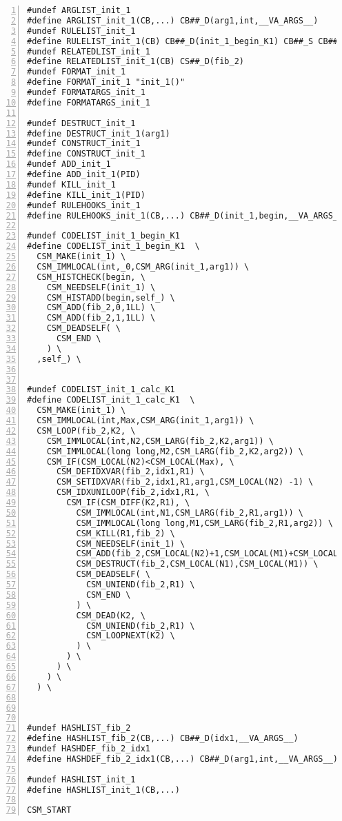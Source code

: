 {\begin{Verbatim}[frame=single,numbers=left]
#undef ARGLIST_init_1
#define ARGLIST_init_1(CB,...) CB##_D(arg1,int,__VA_ARGS__)
#undef RULELIST_init_1
#define RULELIST_init_1(CB) CB##_D(init_1_begin_K1) CB##_S CB##_D(init_1_calc_K1)
#undef RELATEDLIST_init_1
#define RELATEDLIST_init_1(CB) CS##_D(fib_2)
#undef FORMAT_init_1
#define FORMAT_init_1 "init_1()"
#undef FORMATARGS_init_1
#define FORMATARGS_init_1 

#undef DESTRUCT_init_1
#define DESTRUCT_init_1(arg1) 
#undef CONSTRUCT_init_1
#define CONSTRUCT_init_1 
#undef ADD_init_1
#define ADD_init_1(PID) 
#undef KILL_init_1
#define KILL_init_1(PID) 
#undef RULEHOOKS_init_1
#define RULEHOOKS_init_1(CB,...) CB##_D(init_1,begin,__VA_ARGS__)

#undef CODELIST_init_1_begin_K1
#define CODELIST_init_1_begin_K1  \
  CSM_MAKE(init_1) \
  CSM_IMMLOCAL(int,_0,CSM_ARG(init_1,arg1)) \
  CSM_HISTCHECK(begin, \
    CSM_NEEDSELF(init_1) \
    CSM_HISTADD(begin,self_) \
    CSM_ADD(fib_2,0,1LL) \
    CSM_ADD(fib_2,1,1LL) \
    CSM_DEADSELF( \
      CSM_END \
    ) \
  ,self_) \


#undef CODELIST_init_1_calc_K1
#define CODELIST_init_1_calc_K1  \
  CSM_MAKE(init_1) \
  CSM_IMMLOCAL(int,Max,CSM_ARG(init_1,arg1)) \
  CSM_LOOP(fib_2,K2, \
    CSM_IMMLOCAL(int,N2,CSM_LARG(fib_2,K2,arg1)) \
    CSM_IMMLOCAL(long long,M2,CSM_LARG(fib_2,K2,arg2)) \
    CSM_IF(CSM_LOCAL(N2)<CSM_LOCAL(Max), \
      CSM_DEFIDXVAR(fib_2,idx1,R1) \
      CSM_SETIDXVAR(fib_2,idx1,R1,arg1,CSM_LOCAL(N2) -1) \
      CSM_IDXUNILOOP(fib_2,idx1,R1, \
        CSM_IF(CSM_DIFF(K2,R1), \
          CSM_IMMLOCAL(int,N1,CSM_LARG(fib_2,R1,arg1)) \
          CSM_IMMLOCAL(long long,M1,CSM_LARG(fib_2,R1,arg2)) \
          CSM_KILL(R1,fib_2) \
          CSM_NEEDSELF(init_1) \
          CSM_ADD(fib_2,CSM_LOCAL(N2)+1,CSM_LOCAL(M1)+CSM_LOCAL(M2)) \
          CSM_DESTRUCT(fib_2,CSM_LOCAL(N1),CSM_LOCAL(M1)) \
          CSM_DEADSELF( \
            CSM_UNIEND(fib_2,R1) \
            CSM_END \
          ) \
          CSM_DEAD(K2, \
            CSM_UNIEND(fib_2,R1) \
            CSM_LOOPNEXT(K2) \
          ) \
        ) \
      ) \
    ) \
  ) \



#undef HASHLIST_fib_2
#define HASHLIST_fib_2(CB,...) CB##_D(idx1,__VA_ARGS__) 
#undef HASHDEF_fib_2_idx1
#define HASHDEF_fib_2_idx1(CB,...) CB##_D(arg1,int,__VA_ARGS__) 

#undef HASHLIST_init_1
#define HASHLIST_init_1(CB,...) 

CSM_START
\end{Verbatim}
}

